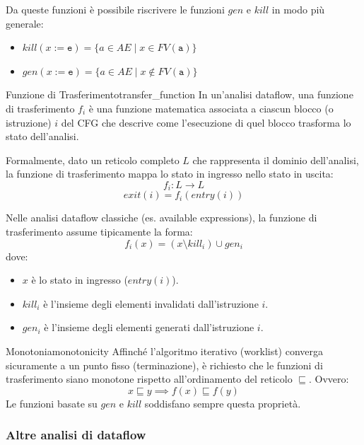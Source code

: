 Da queste funzioni è possibile riscrivere le funzioni $gen$ e $kill$ in modo
più generale:
\begin{itemize}
    \item $kill(x := \texttt{e}) = \{ a \in AE \mid x \in FV(\texttt{a}) \}$
    \item $gen(x := \texttt{e}) = \{ a \in AE \mid x \notin FV(\texttt{a}) \}$
\end{itemize}

\begin{definizione}{Funzione di Trasferimento}{transfer_function}
In un'analisi dataflow, una funzione di trasferimento $f_i$ è una funzione
matematica associata a ciascun blocco (o istruzione) $i$ del CFG che descrive
come l'esecuzione di quel blocco trasforma lo stato dell'analisi.

Formalmente, dato un reticolo completo $L$ che rappresenta il dominio
dell'analisi, la funzione di trasferimento mappa lo stato in ingresso
nello stato in uscita:
\[ f_i : L \to L \]
\[ exit(i) = f_i(entry(i)) \]

Nelle analisi dataflow classiche (es. available
expressions), la funzione di trasferimento assume tipicamente la forma:
\[ f_i(x) = (x \setminus kill_i) \cup gen_i \]
dove:
\begin{itemize}
    \item $x$ è lo stato in ingresso ($entry(i)$).
    \item $kill_i$ è l'insieme degli elementi invalidati dall'istruzione $i$.
    \item $gen_i$ è l'insieme degli elementi generati dall'istruzione $i$.
\end{itemize}
\end{definizione}

\begin{nota}{Monotonia}{monotonicity}
Affinché l'algoritmo iterativo (worklist) converga sicuramente a un punto
fisso (terminazione), è richiesto che le funzioni di trasferimento siano
monotone rispetto all'ordinamento del reticolo $\sqsubseteq$.
Ovvero:
\[ x \sqsubseteq y \implies f(x) \sqsubseteq f(y) \]
Le funzioni basate su $gen$ e $kill$ soddisfano sempre questa proprietà.
\end{nota}

\subsubsection{Altre analisi di dataflow}

